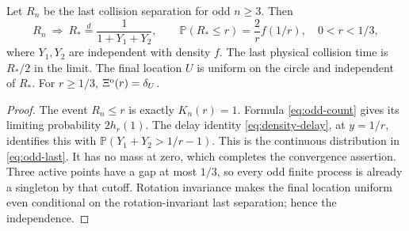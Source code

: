 \documentclass[11pt,letterpaper]{article}
\newcommand{\PP}{\mathbb P}\newcommand{\EE}{\mathbb E}
\begin{document}
\begin{corollary}
\label{cor:odd-last}
Let $R_n$ be the last collision separation for odd $n\ge3$. Then
\begin{equation}\label{eq:odd-last}
 R_n\ \Longrightarrow\ R_*\overset d=\frac1{1+Y_1+Y_2},\qquad
 \PP(R_*\le r)=\frac2r f(1/r),\quad 0<r<1/3,
\end{equation}
where $Y_1,Y_2$ are independent with density $f$.
The last physical collision time is $R_*/2$ in the limit.
The final location $U$ is uniform on the circle and independent of $R_*$.
For $r\ge1/3$, $\Xi^{\rm o}(r)=\delta_U$.
\end{corollary}
\begin{proof}
The event $R_n\le r$ is exactly $K_n(r)=1$. Formula
\eqref{eq:odd-count} gives its limiting probability $2h_r(1)$.
The delay identity \eqref{eq:density-delay}, at $y=1/r$, identifies this
with $\PP(Y_1+Y_2>1/r-1)$. This is the continuous distribution in
\eqref{eq:odd-last}. It has no mass at zero, which completes the
convergence assertion. Three active points have a gap at most $1/3$,
so every odd finite process is already a singleton by that cutoff.
Rotation invariance makes the final location uniform even conditional
on the rotation-invariant last separation; hence the independence.
\end{proof}
\end{document}
